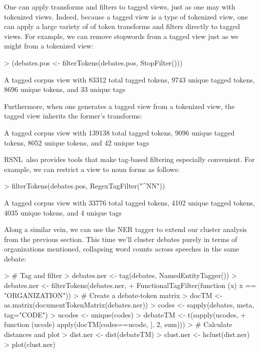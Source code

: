 \documentclass[11pt]{article}
\def\RSNL{{\normalfont\fontseries{b}\selectfont RSNL}}
\begin{document}
One can apply transforms and filters to tagged views, just as one may
with tokenized views.  Indeed, because a tagged view is a type of
tokenized view, one can apply a large variety of of token transforms
and filters directly to tagged views.  For example, we can remove
stopwords from a tagged view just as we might from a tokenized view:
\begin{Schunk}
\begin{Sinput}
> (debates.pos <- filterTokens(debates.pos, StopFilter()))
\end{Sinput}
\begin{Soutput}
A tagged corpus view with 83312 total tagged tokens,
 9743 unique tagged tokens, 8696 unique tokens, and 33 unique tags
\end{Soutput}
\end{Schunk}
Furthermore, when one generates a tagged view from a tokenized view,
the tagged view inherits the former's transforms:
\begin{Schunk}
\begin{Soutput}
A tagged corpus view with 139138 total tagged tokens,
 9096 unique tagged tokens, 8052 unique tokens, and 42 unique tags
\end{Soutput}
\end{Schunk}
\RSNL\ also provides tools that make tag-based filtering especially
convenient.  For example, we can restrict a view to noun forms as follows:
\begin{Schunk}
\begin{Sinput}
> filterTokens(debates.pos, RegexTagFilter("^NN"))
\end{Sinput}
\begin{Soutput}
A tagged corpus view with 33776 total tagged tokens,
 4102 unique tagged tokens, 4035 unique tokens, and 4 unique tags
\end{Soutput}
\end{Schunk}
Along a similar vein, we can use the NER tagger to extend our cluster
analysis from the previous section.  This time we'll cluster debates
purely in terms of organizations mentioned, collapsing word counts
across speeches in the same debate:
\begin{Schunk}
\begin{Sinput}
> # Tag and filter
> debates.ner <- tag(debates, NamedEntityTagger())
> debates.ner <- filterTokens(debates.ner,
+   FunctionalTagFilter(function (x) x == "ORGANIZATION"))
> # Create a debate-token matrix
> docTM <- as.matrix(documentTokenMatrix(debates.ner))
> codes <- sapply(debates, meta, tag="CODE")
> ucodes <- unique(codes)
> debateTM <- t(sapply(ucodes, 
+   function (ucode) apply(docTM[codes==ucode, ], 2, sum)))
> # Calculate distances and plot
> dist.ner <- dist(debateTM)
> clust.ner <- hclust(dist.ner)
> plot(clust.ner)
\end{Sinput}
\end{Schunk}
\end{document}
